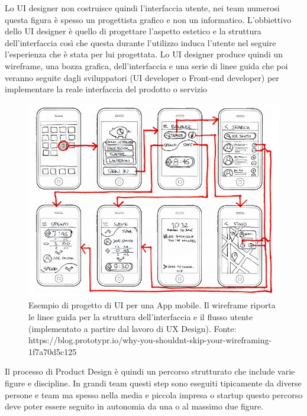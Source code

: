 Lo UI designer non costruisce quindi l'interfaccia utente, nei team numerosi questa figura è spesso un progettista grafico e non un informatico. L'obbiettivo dello UI designer è quello di progettare l'aspetto estetico e la struttura dell'interfaccia così che questa durante l'utilizzo induca l'utente nel seguire l'esperienza che è stata per lui progettata.
Lo UI designer produce quindi un wireframe, una bozza grafica, dell'interfaccia e una serie di linee guida che poi veranno seguite dagli sviluppatori (UI developer o Front-end developer) per implementare la reale interfaccia del prodotto o servizio

\begin{figure}[!h]
	\centering
	\includegraphics[width=\textwidth]{../immagini/uidesign.jpeg}
	\caption{Esempio di progetto di UI per una App mobile. Il wireframe riporta le linee guida per la struttura dell'interfaccia e il flusso utente (implementato a partire dal lavoro di UX Design). Fonte: https://blog.prototypr.io/why-you-shouldnt-skip-your-wireframing-1f7a70d5c125}
\end{figure}



Il processo di Product Design è quindi un percorso strutturato che include varie figure e discipline. In grandi team questi step sono eseguiti tipicamente da diverse persone e team ma spesso nella media e piccola impresa o startup questo percorso deve poter essere seguito in autonomia da una o al massimo due figure.


